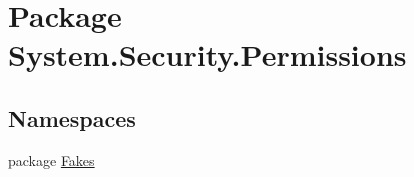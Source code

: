 \hypertarget{namespace_system_1_1_security_1_1_permissions}{\section{Package System.\-Security.\-Permissions}
\label{namespace_system_1_1_security_1_1_permissions}
}
\subsection*{Namespaces}
\begin{DoxyCompactItemize}
\item 
package \hyperlink{namespace_system_1_1_security_1_1_permissions_1_1_fakes}{Fakes}
\end{DoxyCompactItemize}

